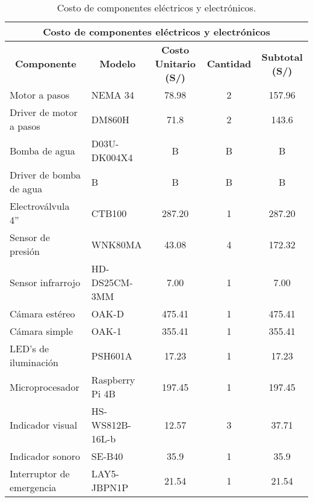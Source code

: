 \begin{table}[H]
	\footnotesize\centering
	\caption{Costo de componentes eléctricos y electrónicos.}
	\label{tab:costo de componentes electricos y electronicos}
	\begin{tabular}{llc|c|c|}
		\hline
		\multicolumn{5}{|c|}{\textbf{Costo de componentes eléctricos y electrónicos}} \\ \hline
		\multicolumn{1}{|c|}{\textbf{Componente}} & \multicolumn{1}{c|}{\textbf{Modelo}} & \multicolumn{1}{c|}{\textbf{Costo Unitario (S/)}} & \multicolumn{1}{c|}{\textbf{Cantidad}} & \multicolumn{1}{c|}{\textbf{Subtotal (S/)}} \\ \hline
		\multicolumn{1}{|l|}{Motor a pasos}  & \multicolumn{1}{l|}{NEMA 34} & 78.98 & 2 & 157.96 \\ \hline
		\multicolumn{1}{|l|}{Driver de motor a pasos}  & \multicolumn{1}{l|}{DM860H} & 71.8 & 2 & 143.6 \\ \hline
		\multicolumn{1}{|l|}{Bomba de agua} & \multicolumn{1}{l|}{D03U-DK004X4} & B & B & B \\ \hline
		\multicolumn{1}{|l|}{Driver de bomba de agua} & \multicolumn{1}{l|}{B} & B & B & B \\ \hline
		\multicolumn{1}{|l|}{Electroválvula 4''} & \multicolumn{1}{l|}{CTB100} & 287.20 & 1 & 287.20 \\ \hline
		\multicolumn{1}{|l|}{Sensor de presión}  & \multicolumn{1}{l|}{WNK80MA} & 43.08 & 4 & 172.32 \\ \hline
		\multicolumn{1}{|l|}{Sensor infrarrojo}  & \multicolumn{1}{l|}{HD-DS25CM-3MM} & 7.00 & 1 & 7.00 \\ \hline
		\multicolumn{1}{|l|}{Cámara estéreo}  & \multicolumn{1}{l|}{OAK-D} & 475.41 & 1 & 475.41 \\ \hline
		\multicolumn{1}{|l|}{Cámara simple}  & \multicolumn{1}{l|}{OAK-1}& 355.41 & 1 & 355.41 \\ \hline
		\multicolumn{1}{|l|}{LED's de iluminación}  & \multicolumn{1}{l|}{PSH601A} & 17.23 & 1 & 17.23 \\ \hline
		\multicolumn{1}{|l|}{Microprocesador}   & \multicolumn{1}{l|}{Raspberry Pi 4B} & 197.45 & 1 & 197.45 \\ \hline
		\multicolumn{1}{|l|}{Indicador visual}  & \multicolumn{1}{l|}{HS-WS812B-16L-b} & 12.57 & 3 & 37.71 \\ \hline
		\multicolumn{1}{|l|}{Indicador sonoro}  & \multicolumn{1}{l|}{SE-B40} & 35.9 & 1 & 35.9 \\ \hline
		\multicolumn{1}{|l|}{Interruptor de emergencia}  & \multicolumn{1}{l|}{LAY5-JBPN1P} & 21.54 & 1 & 21.54 \\ \hline

\end{tabular}
\end{table}

